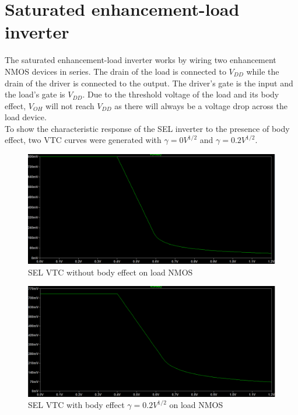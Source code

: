 \documentclass[CMPE]{../KGCOEReport}
\begin{document}
    \section*{Saturated enhancement-load inverter}

    The saturated enhancement-load inverter works by wiring two enhancement
    NMOS devices in series. The drain of the load is connected to $V_{DD}$ while
    the drain of the driver is connected to the output. The driver's gate is the
    input and the load's gate is $V_{DD}$. Due to the threshold voltage of the
    load and its body effect, $V_{OH}$ will not reach $V_{DD}$ as there will always
    be a voltage drop across the load device.\\

	To show the characteristic response of the SEL inverter to the presence of
	body effect, two VTC curves were generated with $\gamma=0V^{1/2}$ and
	$\gamma=0.2V^{1/2}$.

	\begin{figure}[h!]
		\centering
       \includegraphics[width=5.5in]{img/sel_no_body}
       \caption{SEL VTC without body effect on load NMOS}
       \label{fig:no_body}
	 \end{figure}

	\begin{figure}[h!]
		\centering
       \includegraphics[width=5.5in]{img/sel_body}
       \caption{SEL VTC with body effect $\gamma=0.2V^{1/2}$ on load NMOS}
       \label{fig:body}
	 \end{figure}
\end{document}
